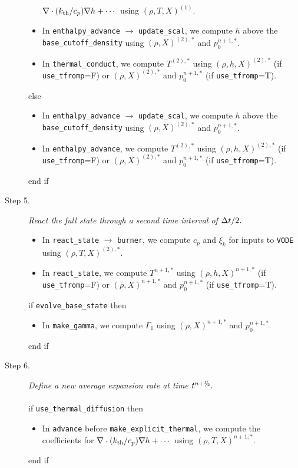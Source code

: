 \begin{description}
\begin{itemize}
$\nabla\cdot(k_{\rm th}/c_p)\nabla h + \cdots$ using $(\rho,T,X)^{(1)}$.
\item In {\tt enthalpy\_advance} $\rightarrow$ {\tt update\_scal}, we compute $h$ above
the {\tt base\_cutoff\_density} using $(\rho,X)^{(2),*}$ and $p_0^{n+1,*}$.
\item In {\tt thermal\_conduct}, we compute $T^{(2),*}$ using $(\rho,h,X)^{(2),*}$
(if {\tt use\_tfromp}=F) or $(\rho,X)^{(2),*}$ and $p_0^{n+1,*}$ (if {\tt use\_tfromp}=T).
\end{itemize}
else
\begin{itemize}
\item In {\tt enthalpy\_advance} $\rightarrow$ {\tt update\_scal}, we compute $h$ above
the {\tt base\_cutoff\_density} using $(\rho,X)^{(2),*}$ and $p_0^{n+1,*}$.
\item In {\tt enthalpy\_advance}, we compute $T^{(2),*}$ using $(\rho,h,X)^{(2),*}$
(if {\tt use\_tfromp}=F) or $(\rho,X)^{(2),*}$ and $p_0^{n+1,*}$ (if {\tt use\_tfromp}=T).
\end{itemize}
end if
\item[Step 5.] {\em React the full state through a second time interval of $\Delta t/2.$}
\begin{itemize}
\item In {\tt react\_state} $\rightarrow$ {\tt burner}, we compute $c_p$ and $\xi_k$ 
for inputs to {\tt VODE} using $(\rho,T,X)^{(2),*}$.
\item In {\tt react\_state}, we compute $T^{n+1,*}$ using $(\rho,h,X)^{n+1,*}$ 
(if {\tt use\_tfromp}=F) or $(\rho,X)^{n+1,*}$ and $p_0^{n+1,*}$ (if {\tt use\_tfromp}=T).
\end{itemize}
if {\tt evolve\_base\_state} then
\begin{itemize}
\item In {\tt make\_gamma}, we compute $\Gamma_1$ using $(\rho,X)^{n+1,*}$ and $p_0^{n+1,*}$.
\end{itemize}
end if
\item[Step 6.] {\em Define a new average expansion rate at time $t^\nph.$}\\ \\
if {\tt use\_thermal\_diffusion} then
\begin{itemize}
\item In {\tt advance} before {\tt make\_explicit\_thermal}, we compute the coefficients for 
$\nabla\cdot(k_{\rm th}/c_p)\nabla h + \cdots$ using $(\rho,T,X)^{n+1,*}$.
\end{itemize}
end if
\begin{itemize}

\end{itemize}
\end{description}
